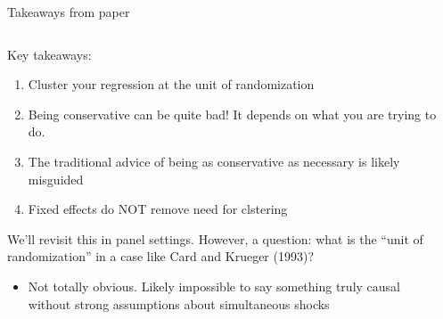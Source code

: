 \documentclass[notes,11pt, aspectratio=169]{beamer}
\newenvironment{wideitemize}{\itemize\addtolength{\itemsep}{10pt}}{\enditemize}
\begin{document}
\begin{frame}{Takeaways from paper}
\begin{columns}[T] %
\begin{column}{.8\textwidth}
  \begin{wideitemize}
  \item Key takeaways:
    \begin{enumerate}
    \item Cluster your regression at the unit of randomization
    \item Being conservative can be quite bad! It depends on what you are trying to do.
    \item The traditional advice of being as conservative as necessary
      is likely misguided
    \item Fixed effects do NOT remove need for clstering
    \end{enumerate}
  \item We'll revisit this in panel settings. However, a question:
    what is the ``unit of randomization'' in a case like Card and
    Krueger (1993)?
    \begin{itemize}
    \item Not totally obvious. Likely impossible to say something
      truly causal without strong assumptions about simultaneous
      shocks
    \end{itemize}
  \end{wideitemize}
  \end{column}%
  \hfill%
  \begin{column}{.5\textwidth}
  \end{column}
\end{columns}
\end{frame}
\end{document}

